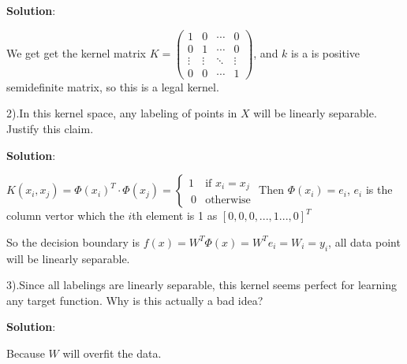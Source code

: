 \documentclass{article}
\newcommand{\solution}{\textbf{\large Solution}}
\begin{document}
\begin{enumerate}
		\solution:

		We get get the kernel matrix 
		$ K = 
				\begin{pmatrix}
					1 & 0 & \cdots & 0 \\
					0 & 1 & \cdots & 0 \\
					\vdots & \vdots & \ddots & \vdots \\
					0 & 0 & \cdots & 1 
				\end{pmatrix}
		$, and $k$ is a is positive semidefinite matrix, so this is a legal kernel.
		
		2).In this kernel space, any labeling of points in $X$ will be linearly separable. Justify this claim.

		\solution:

		$K(x_i,x_j)=\Phi(x_i)^T \cdot \Phi(x_j) = \begin{cases}
			1 &\mbox{if $x_i=x_j$}\\\
			0 &\mbox{otherwise}
			\end{cases}
		$
		Then $\Phi(x_i) = e_i$, $e_i$ is the column vertor which the $i$th element is 1 as $[0,0,0,...,1..., 0]^T$

		So the decision boundary is $f(x) = W^T \Phi(x) = W^T e_i = W_i = y_i$, all data point will be  linearly separable.
		
		3).Since all labelings are linearly separable, this kernel seems perfect for learning any target
		function. Why is this actually a bad idea?
		
		\solution:

		Because $W$ will overfit the data.
		
	\end{enumerate}
\end{document}
